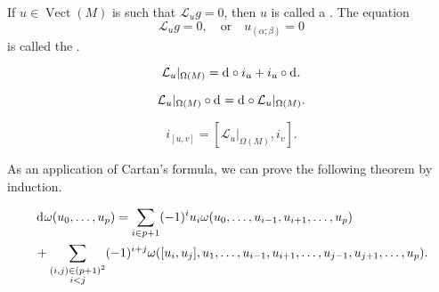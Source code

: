 \documentclass[openany, oneside, a5paper]{book}
\DeclareMathOperator{\Vect}{Vect}
\begin{document}

\begin{definition}
    If $u \in \Vect(M)$ is such that $\mathcal L_u g = 0$, then $u$ is called a . 
    The equation
    \begin{equation}
        \mathcal L_u g = 0,
        \quad \text{or} \quad
        u_{(\alpha;\beta)} = 0
    \end{equation}
    is called the .
\end{definition}

\begin{theorem}\label{theorem: Cartan formula}
    \begin{equation}
        \mathcal L_u |_{\Omega(M)} = \mathop{}\!\mathrm{d}^{} \circ i_u + i_u \circ \mathop{}\!\mathrm{d}^{}.
    \end{equation}
\end{theorem}

\begin{corollary}
    \begin{equation}
        \mathcal L_u |_{\Omega(M)} \circ \mathop{}\!\mathrm{d}^{} = \mathop{}\!\mathrm{d}^{} \circ \mathcal L_u |_{\Omega(M)}.
    \end{equation}
\end{corollary}

\begin{corollary}
    \begin{equation}
        i_{[u, v]} = [\mathcal L_u |_{\Omega(M)}, i_v].
    \end{equation}
\end{corollary}

As an application of Cartan's formula, we can prove the following theorem by induction.
\begin{theorem}\label{theorem: exterior differential formula}
    {\small
        \begin{align}
        &\mathop{}\!\mathrm{d}^{} \omega(u_0, \ldots, u_p) 
            = \sum_{i \in p + 1} (-1)^i u_i \omega(u_0, \ldots, u_{i-1}, u_{i+1}, \ldots, u_p)
            \\
            &
            + \sum_{\substack{
                (i, j) \in (p + 1)^2
                \\
                i < j
                }} (-1)^ {i + j} \omega([u_i, u_j], u_1, \ldots, u_{i-1}, u_{i+1}, \ldots, u_{j-1}, u_{j+1}, \ldots, u_p).
    \end{align}
    }
\end{theorem}
\end{document}
